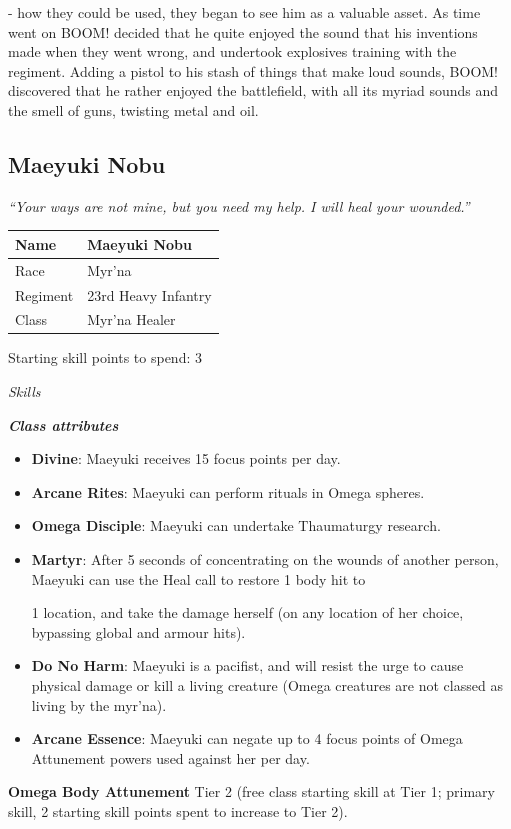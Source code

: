 - how they could be used, they began to see him as a valuable asset. As time went on BOOM! decided that he quite enjoyed the sound that his inventions made when they went wrong, and undertook explosives training with the regiment. Adding a pistol to his stash of things that make loud sounds, BOOM! discovered that he rather enjoyed the battlefield, with all its myriad sounds and the smell of guns, twisting metal and oil.

\subsection{Maeyuki Nobu}

\textit{``Your ways are not mine, but you need my help. I will heal your wounded.''}

\begin{table}
\begin{tabular}{|l|l|} \hline 
Name & Maeyuki Nobu \\
 \hline Race & Myr'na \\
 \hline Regiment & 23rd Heavy Infantry \\
 \hline Class & Myr'na Healer \\
 \hline \end{tabular}

\end{table}

Starting skill points to spend: 3

\textit{Skills}

\textbf{\textit{Class attributes}}

\begin{itemize}
\item \textbf{Divine}: Maeyuki receives 15 focus points per day.

\item \textbf{Arcane Rites}: Maeyuki can perform rituals in Omega spheres.

\item \textbf{Omega Disciple}: Maeyuki can undertake Thaumaturgy research.

\item \textbf{Martyr}: After 5 seconds of concentrating on the wounds of another person, Maeyuki can use the Heal call to restore 1 body hit to

1 location, and take the damage herself (on any location of her choice, bypassing global and armour hits).

\item \textbf{Do No Harm}: Maeyuki is a pacifist, and will resist the urge to cause physical damage or kill a living creature (Omega creatures are not classed as living by the myr'na).

\item \textbf{Arcane Essence}: Maeyuki can negate up to 4 focus points of Omega Attunement powers used against her per day.

\end{itemize}
\textbf{Omega Body Attunement} Tier 2 (free class starting skill at Tier 1; primary skill, 2 starting skill points spent to increase to Tier 2).

